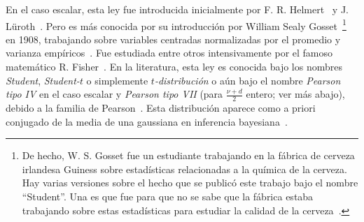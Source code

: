 \label{Sssec:MP:StudentT}

En   el  caso   escalar,  esta   ley   fue  introducida   inicialmente  por   F.
R. Helmert~\cite{Hel75, Hel76, She95}  y J.  L\"uroth~\cite{Lur76, Pfa96}.  Pero
es m\'as  conocida por su  introducci\'on por William  Sealy Gosset~\footnote{De
  hecho, W.  S.  Gosset fue un estudiante trabajando en  la f\'abrica de cerveza
  irlandesa  Guiness sobre  estad\'isticas  relacionadas a  la  qu\'imica de  la
  cerveza.  Hay  varias versiones sobre el  hecho que se  public\'o este trabajo
  bajo  el nombre  ``Student''.  Una  es que  fue  para que  no se  sabe que  la
  f\'abrica  estaba  trabajando  sobre  estas estad\'isticas  para  estudiar  la
  calidad   de   la   cerveza~\cite{Wen16}.\label{Foot:MP:Student}}   en   1908,
trabajando  sobre variables centradas  normalizadas por  el promedio  y varianza
emp\'iricos~\cite{Stu08}.   Fue  estudiada  entre  otros intensivamente  por  el
famoso  matem\'atico R.   Fisher~\cite{Fis25}.  En  la literatura,  esta  ley es
conocida bajo  los nombres {\em  Student}, {\em Student-$t$} o  simplemente {\em
  $t$-distribuci\'on} o  a\'un bajo el nombre  {\em Pearson tipo IV}  en el caso
escalar  y {\em  Pearson tipo  VII}  (para $\frac{\nu+d}{2}$  entero; ver  m\'as
abajo), debido  a la  familia de Pearson~\cite{Pea95,  JohKot95:v1, JohKot95:v1,
  KotBal00, FanKot90}.   Esta distribuci\'on aparece como a  priori conjugado de
la media de una gaussiana en inferencia bayesiana~\cite{Rob07, KotNad04}.

